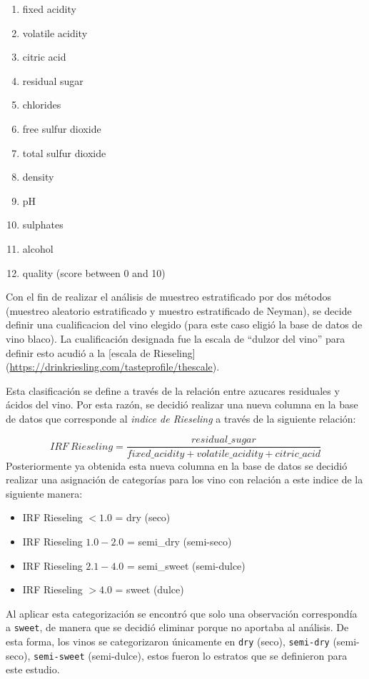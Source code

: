 \documentclass[
]{article}
\providecommand{\tightlist}{%
  \setlength{\itemsep}{0pt}\setlength{\parskip}{0pt}}
\begin{document}
\begin{enumerate}
\def\labelenumi{\arabic{enumi}.}
\tightlist
\item
  fixed acidity
\item
  volatile acidity
\item
  citric acid
\item
  residual sugar
\item
  chlorides
\item
  free sulfur dioxide
\item
  total sulfur dioxide
\item
  density
\item
  pH
\item
  sulphates
\item
  alcohol
\item
  quality (score between 0 and 10)
\end{enumerate}

Con el fin de realizar el análisis de muestreo estratificado por dos
métodos (muestreo aleatorio estratificado y muestro estratificado de
Neyman), se decide definir una cualificacion del vino elegido (para este
caso eligió la base de datos de vino blaco). La cualificación designada
fue la escala de ``dulzor del vino'' para definir esto acudió a la
{[}escala de Rieseling{]}
(\url{https://drinkriesling.com/tasteprofile/thescale}).

Esta clasificación se define a través de la relación entre azucares
residuales y ácidos del vino. Por esta razón, se decidió realizar una
nueva columna en la base de datos que corresponde al \emph{indice de
Rieseling} a través de la siguiente relación:

\[
IRF\ Rieseling = \frac{residual\_sugar} {fixed\_ acidity+volatile\_ acidity+citric\_ acid}
\] Posteriormente ya obtenida esta nueva columna en la base de datos se
decidió realizar una asignación de categorías para los vino con relación
a este indice de la siguiente manera:

\begin{itemize}
\tightlist
\item
  IRF Rieseling \(< 1.0\) = dry (seco)
\item
  IRF Rieseling \(1.0 - 2.0\) = semi\_dry (semi-seco)
\item
  IRF Rieseling \(2.1 - 4.0\) = semi\_sweet (semi-dulce)
\item
  IRF Rieseling \(> 4.0\) = sweet (dulce)
\end{itemize}

Al aplicar esta categorización se encontró que solo una observación
correspondía a \texttt{sweet}, de manera que se decidió eliminar porque
no aportaba al análisis. De esta forma, los vinos se categorizaron
únicamente en \texttt{dry} (seco), \texttt{semi-dry} (semi-seco),
\texttt{semi-sweet} (semi-dulce), estos fueron lo estratos que se
definieron para este estudio.
\end{document}
